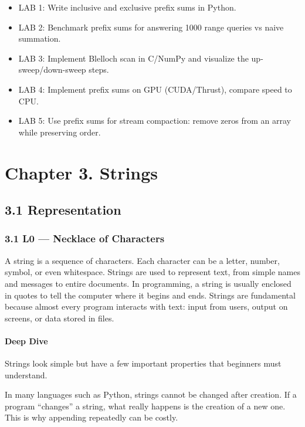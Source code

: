\documentclass[
  letterpaper,
  DIV=11,
  numbers=noendperiod]{scrreprt}
\providecommand{\tightlist}{%
  \setlength{\itemsep}{0pt}\setlength{\parskip}{0pt}}
\begin{document}
\begin{itemize}
\tightlist
\item
  LAB 1: Write inclusive and exclusive prefix sums in Python.
\item
  LAB 2: Benchmark prefix sums for answering 1000 range queries vs naive
  summation.
\item
  LAB 3: Implement Blelloch scan in C/NumPy and visualize the
  up-sweep/down-sweep steps.
\item
  LAB 4: Implement prefix sums on GPU (CUDA/Thrust), compare speed to
  CPU.
\item
  LAB 5: Use prefix sums for stream compaction: remove zeros from an
  array while preserving order.
\end{itemize}


\chapter{Chapter 3. Strings}\label{chapter-3.-strings}

\section{3.1 Representation}\label{representation-1}

\subsection{3.1 L0 --- Necklace of
Characters}\label{l0-necklace-of-characters}

A string is a sequence of characters. Each character can be a letter,
number, symbol, or even whitespace. Strings are used to represent text,
from simple names and messages to entire documents. In programming, a
string is usually enclosed in quotes to tell the computer where it
begins and ends. Strings are fundamental because almost every program
interacts with text: input from users, output on screens, or data stored
in files.

\subsubsection{Deep Dive}\label{deep-dive-22}

Strings look simple but have a few important properties that beginners
must understand.

In many languages such as Python, strings cannot be changed after
creation. If a program ``changes'' a string, what really happens is the
creation of a new one. This is why appending repeatedly can be costly.
\end{document}
